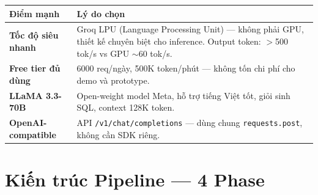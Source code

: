 \documentclass[12pt, a4paper]{article}
\begin{document}
\begin{tcolorbox}[colback=groqgreen!5, colframe=groqgreen!50, arc=5pt]
\renewcommand{\arraystretch}{1.4}
\begin{tabularx}{\textwidth}{>{\bfseries}p{3.5cm} X}
\toprule
Điểm mạnh & Lý do chọn \\
\midrule
Tốc độ siêu nhanh &
  Groq LPU (Language Processing Unit) — không phải GPU, thiết kế chuyên biệt
  cho inference. Output token: $>$500 tok/s vs GPU $\sim$60 tok/s. \\
Free tier đủ dùng &
  6000 req/ngày, 500K token/phút — không tốn chi phí cho demo và prototype. \\
LLaMA 3.3-70B &
  Open-weight model Meta, hỗ trợ tiếng Việt tốt, giỏi sinh SQL,
  context 128K token. \\
OpenAI-compatible &
  API \texttt{/v1/chat/completions} — dùng chung \texttt{requests.post}, không cần SDK riêng. \\
\bottomrule
\end{tabularx}
\end{tcolorbox}

\newpage

\section{Kiến trúc Pipeline — 4 Phase}
\end{document}
